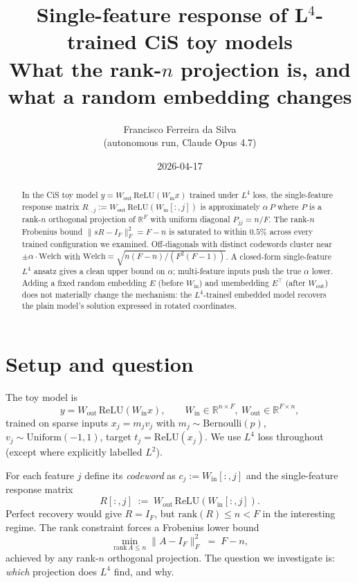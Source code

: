\documentclass[11pt]{article}
\title{Single-feature response of L$^4$-trained CiS toy models\\
\large What the rank-$n$ projection is, and what a random embedding changes}
\author{Francisco Ferreira da Silva\\{\small (autonomous run, Claude Opus 4.7)}}
\date{2026-04-17}
\newcommand{\Wein}{W_{\mathrm{in}}}
\newcommand{\Weout}{W_{\mathrm{out}}}
\begin{document}
\maketitle

\begin{abstract}
\noindent
In the CiS toy model $y = \Weout\,\mathrm{ReLU}(\Wein x)$ trained under $L^4$
loss, the single-feature response matrix
$R_{:,j} := \Weout\,\mathrm{ReLU}(\Wein[:,j])$ is approximately $\alpha\,P$
where $P$ is a rank-$n$ orthogonal projection of $\mathbb{R}^F$ with uniform
diagonal $P_{jj} = n/F$. The rank-$n$ Frobenius bound
$\|sR - I_F\|_F^2 = F - n$ is saturated to within $0.5\%$ across every
trained configuration we examined. Off-diagonals with distinct codewords
cluster near $\pm \alpha \cdot \mathrm{Welch}$ with
$\mathrm{Welch} = \sqrt{n(F-n)/(F^2(F-1))}$. A closed-form single-feature
$L^4$ ansatz gives a clean upper bound on $\alpha$; multi-feature inputs
push the true $\alpha$ lower. Adding a fixed random embedding $E$ (before
$\Wein$) and unembedding $E^\top$ (after $\Weout$) does not materially
change the mechanism: the $L^4$-trained embedded model recovers the plain
model's solution expressed in rotated coordinates.
\end{abstract}

\section{Setup and question}

The toy model is
\begin{equation*}
y = \Weout\,\mathrm{ReLU}(\Wein x), \qquad \Wein \in \mathbb{R}^{n \times F},\ \Weout \in \mathbb{R}^{F \times n},
\end{equation*}
trained on sparse inputs $x_j = m_j v_j$ with $m_j \sim \mathrm{Bernoulli}(p)$,
$v_j \sim \mathrm{Uniform}(-1,1)$, target $t_j = \mathrm{ReLU}(x_j)$. We use
$L^4$ loss throughout (except where explicitly labelled $L^2$).

For each feature $j$ define its \emph{codeword} as $c_j := \Wein[:,j]$ and the
single-feature response matrix
\begin{equation}\label{eq:R}
R[:, j] \;:=\; \Weout\,\mathrm{ReLU}(\Wein[:, j]).
\end{equation}
Perfect recovery would give $R = I_F$, but $\mathrm{rank}(R) \le n < F$ in the
interesting regime. The rank constraint forces a Frobenius lower bound
\begin{equation*}
\min_{\mathrm{rank}\,A \le n} \|A - I_F\|_F^2 \;=\; F - n,
\end{equation*}
achieved by any rank-$n$ orthogonal projection. The question we investigate is:
\emph{which} projection does $L^4$ find, and why.
\end{document}
